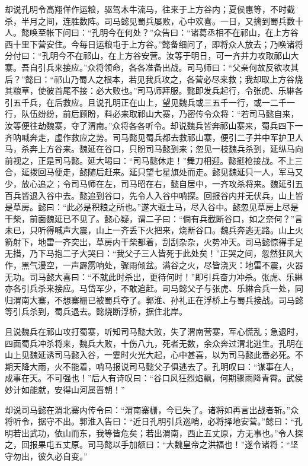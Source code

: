 却说孔明令高翔佯作运粮，驱驾木牛流马，往来于上方谷内；夏侯惠等，不时截杀，半月之间，连胜数阵。司马懿见蜀兵屡败，心中欢喜。一日，又擒到蜀兵数十人。懿唤至帐下问曰：“孔明今在何处？”众告曰：“诸葛丞相不在祁山，在上方谷西十里下营安住。今每日运粮屯于上方谷。”懿备细问了，即将众人放去；乃唤诸将分付曰：“孔明今不在祁山，在上方谷安营。汝等于明日，可一齐并力攻取祁山大寨。吾自引兵来接应。”众将领命，各各准备出战。司马师曰：“父亲何故反欲攻其后？”懿曰：“祁山乃蜀人之根本，若见我兵攻之，各营必尽来救；我却取上方谷烧其粮草，使彼首尾不接：必大败也。”司马师拜服。懿即发兵起行，令张虎、乐綝各引五千兵，在后救应。且说孔明正在山上，望见魏兵或三五千一行，或一二千一行，队伍纷纷，前后顾盼，料必来取祁山大寨，乃密传令众将：“若司马懿自来，汝等便往劫魏寨，夺了渭南。”众将各各听令。却说魏兵皆奔祁山寨来，蜀兵四下一齐呐喊奔走，虚作救应之势。司马懿见蜀兵都去救祁山寨，便引二子并中军护卫人马，杀奔上方谷来。魏延在谷口，只盼司马懿到来；忽见一枝魏兵杀到，延纵马向前视之，正是司马懿。延大喝曰：“司马懿休走！”舞刀相迎。懿挺枪接战。不上三合，延拨回马便走，懿随后赶来。延只望七星旗处而走。懿见魏延只一人，军马又少，放心追之；令司马师在左，司马昭在右，懿自居中，一齐攻杀将来。魏延引五百兵皆退入谷中去。懿追到谷口，先令人入谷中哨探。回报谷内并无伏兵，山上皆是草房。懿曰：“此必是积粮之所也。”遂大驱士马，尽入谷中。懿忽见草房上尽是干柴，前面魏延已不见了。懿心疑，谓二子曰：“倘有兵截断谷口，如之奈何？”言未已，只听得喊声大震，山上一齐丢下火把来，烧断谷口。魏兵奔逃无路。山上火箭射下，地雷一齐突出，草房内干柴都着，刮刮杂杂，火势冲天。司马懿惊得手足无措，乃下马抱二子大哭曰：“我父子三人皆死于此处矣！”正哭之间，忽然狂风大作，黑气漫空，一声霹雳响处，骤雨倾盆。满谷之火，尽皆浇灭：地雷不震，火器无功。司马懿大喜曰：“不就此时杀出，更待何时！”即引兵奋力冲杀。张虎、乐綝亦各引兵杀来接应。马岱军少，不敢追赶。司马懿父子与张虎、乐綝合兵一处，同归渭南大寨，不想寨栅已被蜀兵夺了。郭淮、孙礼正在浮桥上与蜀兵接战。司马懿等引兵杀到，蜀兵退去。懿烧断浮桥，据住北岸。

且说魏兵在祁山攻打蜀寨，听知司马懿大败，失了渭南营寨，军心慌乱；急退时，四面蜀兵冲杀将来，魏兵大败，十伤八九，死者无数，余众奔过渭北逃生。孔明在山上见魏延诱司马懿入谷，一霎时火光大起，心中甚喜，以为司马懿此番必死。不期天降大雨，火不能着，哨马报说司马懿父子俱逃去了。孔明叹曰：“谋事在人，成事在天。不可强也！”后人有诗叹曰：“谷口风狂烈焰飘，何期骤雨降青霄。武侯妙计如能就，安得山河属晋朝！”

却说司马懿在渭北寨内传令曰：“渭南寨栅，今已失了。诸将如再言出战者斩。”众将听令，据守不出。郭淮入告曰：“近日孔明引兵巡哨，必将择地安营。”懿曰：“孔明若出武功，依山而东，我等皆危矣；若出渭南，西止五丈原，方无事也。”令人探之，回报果屯五丈原。司马懿以手加额曰：“大魏皇帝之洪福也！”遂令诸将：“坚守勿出，彼久必自变。”

